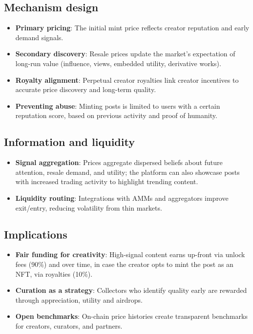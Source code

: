 \documentclass[10pt]{article}
\begin{document}
    \subsection{Mechanism design}
    \begin{itemize}[leftmargin=*]
      \item \textbf{Primary pricing}: The initial mint price reflects creator reputation and early demand signals.
      \item \textbf{Secondary discovery}: Resale prices update the market's expectation of long-run value (influence, views, embedded utility, derivative works).
      \item \textbf{Royalty alignment}: Perpetual creator royalties link creator incentives to accurate price discovery and long-term quality.
      \item \textbf{Preventing abuse}: Minting posts is limited to users with a certain reputation score, based on previous activity and proof of humanity.
    \end{itemize}

    \subsection{Information and liquidity}
      \begin{itemize}[leftmargin=*]
        \item \textbf{Signal aggregation}: Prices aggregate dispersed beliefs about future attention, resale demand, and utility; the platform can also showcase posts with increased trading activity to highlight trending content.
        \item \textbf{Liquidity routing}: Integrations with AMMs and aggregators improve exit/entry, reducing volatility from thin markets.
      \end{itemize}

    \subsection{Implications}
      \begin{itemize}[leftmargin=*]
        \item \textbf{Fair funding for creativity}: High-signal content earns up-front via unlock fees (90\%) and over time, in case the creator opts to mint the post as an NFT, via royalties (10\%).
        \item \textbf{Curation as a strategy}: Collectors who identify quality early are rewarded through appreciation, utility and \textbf{\tokenticker} airdrops.
        \item \textbf{Open benchmarks}: On-chain price histories create transparent benchmarks for creators, curators, and partners.
      \end{itemize}
\end{document}
